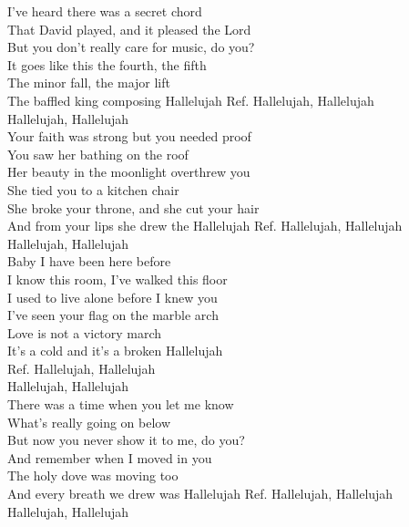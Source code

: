 \begin{flushleft}
I've heard there was a secret chord\\
That David played, and it pleased the Lord\\
But you don't really care for music, do you?\\
It goes like this the fourth, the fifth\\
The minor fall, the major lift\\
The baffled king composing Hallelujah
\hops
Ref. Hallelujah, Hallelujah\\
\hspace{0.9cm}Hallelujah, Hallelujah\\
\hops
Your faith was strong but you needed proof\\
You saw her bathing on the roof\\
Her beauty in the moonlight overthrew you\\
She tied you to a kitchen chair\\
She broke your throne, and she cut your hair\\
And from your lips she drew the Hallelujah
\hops
Ref. Hallelujah, Hallelujah\\
\hspace{0.9cm}Hallelujah, Hallelujah\\
\hops
Baby I have been here before\\
I know this room, I've walked this floor\\
I used to live alone before I knew you\\
I've seen your flag on the marble arch\\
Love is not a victory march\\
It's a cold and it's a broken Hallelujah\\
\hops
Ref. Hallelujah, Hallelujah\\
\hspace{0.9cm}Hallelujah, Hallelujah\\
\hops
There was a time when you let me know\\
What's really going on below\\
But now you never show it to me, do you?\\
And remember when I moved in you\\
The holy dove was moving too\\
And every breath we drew was Hallelujah
\hops
Ref. Hallelujah, Hallelujah\\
\hspace{0.9cm}Hallelujah, Hallelujah\\

\end{flushleft}
